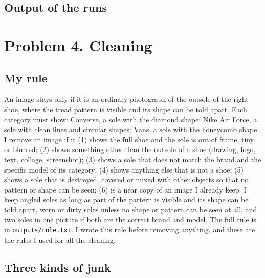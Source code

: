 \documentclass[11pt]{article}
\begin{document}
\hfill
{}\hfill
{}

\subsection*{Output of the runs}

\section*{Problem 4. Cleaning}
\subsection*{My rule}
An image stays only if it is an ordinary photograph of the outsole of the right shoe, where the tread pattern is visible and its shape can be told apart. Each category must show: Converse, a sole with the diamond shape; Nike Air Force, a sole with clean lines and circular shapes; Vans, a sole with the honeycomb shape. I remove an image if it (1) shows the full shoe and the sole is out of frame, tiny or blurred; (2) shows something other than the outsole of a shoe (drawing, logo, text, collage, screenshot); (3) shows a sole that does not match the brand and the specific model of its category; (4) shows anything else that is not a shoe; (5) shows a sole that is destroyed, covered or mixed with other objects so that no pattern or shape can be seen; (6) is a near copy of an image I already keep. I keep angled soles as long as part of the pattern is visible and its shape can be told apart, worn or dirty soles unless no shape or pattern can be seen at all, and two soles in one picture if both are the correct brand and model. The full rule is in \texttt{outputs/rule.txt}. I wrote this rule before removing anything, and these are the rules I used for all the cleaning.


\subsection*{Three kinds of junk}
\hfill
{}\hfill
{}
\end{document}
